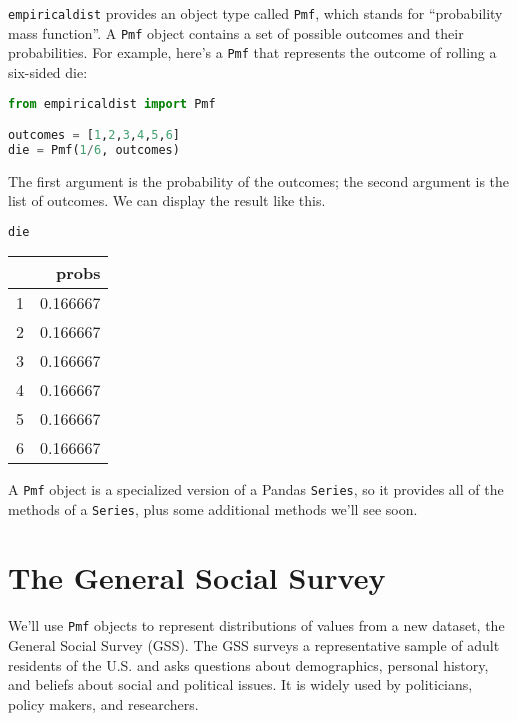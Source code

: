 \passthrough{\lstinline!empiricaldist!} provides an object type called
\passthrough{\lstinline!Pmf!}, which stands for ``probability mass
function''. A \passthrough{\lstinline!Pmf!} object contains a set of
possible outcomes and their probabilities. For example, here's a
\passthrough{\lstinline!Pmf!} that represents the outcome of rolling a
six-sided die:

\begin{lstlisting}[language=Python,style=source]
from empiricaldist import Pmf

outcomes = [1,2,3,4,5,6]
die = Pmf(1/6, outcomes)
\end{lstlisting}

The first argument is the probability of the outcomes; the second
argument is the list of outcomes. We can display the result like this.

\begin{lstlisting}[language=Python,style=source]
die
\end{lstlisting}

\begin{tabular}{lr}
\toprule
 & probs \\
\midrule
1 & 0.166667 \\
2 & 0.166667 \\
3 & 0.166667 \\
4 & 0.166667 \\
5 & 0.166667 \\
6 & 0.166667 \\
\bottomrule
\end{tabular}

A \passthrough{\lstinline!Pmf!} object is a specialized version of a
Pandas \passthrough{\lstinline!Series!}, so it provides all of the
methods of a \passthrough{\lstinline!Series!}, plus some additional
methods we'll see soon.

\section{The General Social Survey}\label{the-general-social-survey}

We'll use \passthrough{\lstinline!Pmf!} objects to represent
distributions of values from a new dataset, the General Social Survey
(GSS). The GSS surveys a representative sample of adult residents of the
U.S. and asks questions about demographics, personal history, and
beliefs about social and political issues. It is widely used by
politicians, policy makers, and researchers.

